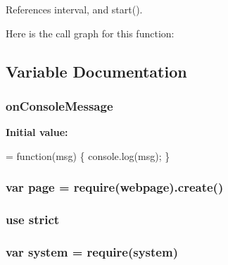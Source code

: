 References interval, and start().



Here is the call graph for this function\+:




\subsection{Variable Documentation}
\subsubsection[{\texorpdfstring{on\+Console\+Message}{onConsoleMessage}}]{ on\+Console\+Message}\hypertarget{run-jasmine2_8js_a87e6a5ff0ebb4d272a04b52dd70224c6}{}\label{run-jasmine2_8js_a87e6a5ff0ebb4d272a04b52dd70224c6}
{\bfseries Initial value\+:}
\begin{DoxyCode}
= \textcolor{keyword}{function}(msg) \{
    console.log(msg);
\}
\end{DoxyCode}
\subsubsection[{\texorpdfstring{page}{page}}]{\setlength{\rightskip}{0pt plus 5cm}var page = require(\textquotesingle{}webpage\textquotesingle{}).create()}\hypertarget{run-jasmine2_8js_a85d8b1b97106b359e1c9ee119ebe5832}{}\label{run-jasmine2_8js_a85d8b1b97106b359e1c9ee119ebe5832}
\subsubsection[{\texorpdfstring{strict}{strict}}]{\setlength{\rightskip}{0pt plus 5cm}use strict}\hypertarget{run-jasmine2_8js_ae2475e10618961c050dcba04e8c42331}{}\label{run-jasmine2_8js_ae2475e10618961c050dcba04e8c42331}
\subsubsection[{\texorpdfstring{system}{system}}]{\setlength{\rightskip}{0pt plus 5cm}var system = require(\textquotesingle{}system\textquotesingle{})}\hypertarget{run-jasmine2_8js_acdb77dc97eb44e91baaadd41d9d078fc}{}\label{run-jasmine2_8js_acdb77dc97eb44e91baaadd41d9d078fc}
